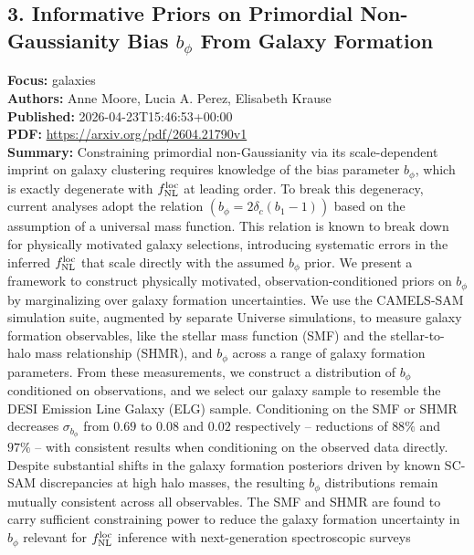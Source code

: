 \documentclass[11pt]{article}
\begin{document}
\subsection*{3. Informative Priors on Primordial Non-Gaussianity Bias $b_\phi $ From Galaxy Formation}
\textbf{Focus:} galaxies\\
\textbf{Authors:} Anne Moore, Lucia A. Perez, Elisabeth Krause\\
\textbf{Published:} 2026-04-23T15:46:53+00:00\\
\textbf{PDF:} \href{https://arxiv.org/pdf/2604.21790v1}{https://arxiv.org/pdf/2604.21790v1}\\
\textbf{Summary:}
Constraining primordial non-Gaussianity via its scale-dependent imprint on galaxy clustering requires knowledge of the bias parameter $b_\phi $, which is exactly degenerate with $f^{\rm{loc}}_{\rm{NL}}$ at leading order. To break this degeneracy, current analyses adopt the relation $\left(b_\phi  = 2\delta _c\left(b_1 - 1\right)\right)$ based on the assumption of a universal mass function. This relation is known to break down for physically motivated galaxy selections, introducing systematic errors in the inferred $f^{\rm{loc}}_{\rm{NL}}$ that scale directly with the assumed $b_\phi $ prior. We present a framework to construct physically motivated, observation-conditioned priors on $b_\phi $ by marginalizing over galaxy formation uncertainties. We use the CAMELS-SAM simulation suite, augmented by separate Universe simulations, to measure galaxy formation observables, like the stellar mass function (SMF) and the stellar-to-halo mass relationship (SHMR), and $b_\phi $ across a range of galaxy formation parameters. From these measurements, we construct a distribution of $b_\phi $ conditioned on observations, and we select our galaxy sample to resemble the DESI Emission Line Galaxy (ELG) sample. Conditioning on the SMF or SHMR decreases $\sigma _{b_\phi }$ from $0.69$ to $0.08$ and $0.02$ respectively -- reductions of $88\%$ and $97\%$ -- with consistent results when conditioning on the observed data directly. Despite substantial shifts in the galaxy formation posteriors driven by known SC-SAM discrepancies at high halo masses, the resulting $b_\phi $ distributions remain mutually consistent across all observables. The SMF and SHMR are found to carry sufficient constraining power to reduce the galaxy formation uncertainty in $b_\phi $ relevant for $f^{\rm{loc}}_{\rm{NL}}$ inference with next-generation spectroscopic surveys
\newpage
\end{document}

